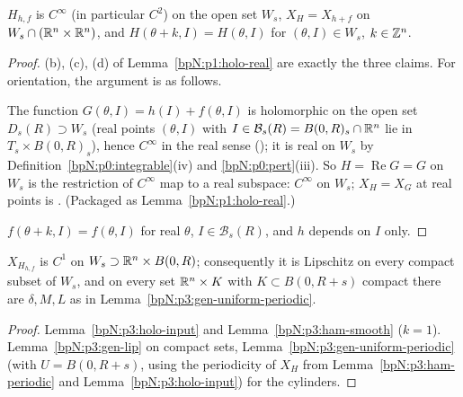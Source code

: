 \begin{lemma}\label{bpN:p3:holo-input}
$H_{h,f}$ is $C^\infty$ (in particular $C^2$) on the open set $W_s$, $X_{H}=X_{h+f}$ on $W_s\cap(\mathbb{R}^n\times\mathbb{R}^n)$, and
$H(\theta+k,I)=H(\theta,I)$ for $(\theta,I)\in W_s$, $k\in\mathbb{Z}^n$.
\end{lemma}
\begin{proof}
\label{stepN:p3:hi-cite} (b), (c), (d) of Lemma~\ref{bpN:p1:holo-real} are exactly the three claims. For orientation, the argument is as follows.

\label{stepN:p3:hi-reg} The function $G(\theta,I)=h(I)+f(\theta,I)$ is holomorphic on the open set $D_s(R)\supset W_s$ (real points $(\theta,I)$ with $I\in\mathcal B_s(R)=B(0,R)_s\cap\mathbb{R}^n$ lie in $T_s\times B(0,R)_s$), hence $C^\infty$ in the real sense (); it is real on $W_s$ by Definition~\ref{bpN:p0:integrable}(iv) and \ref{bpN:p0:pert}(iii). So $H=\operatorname{Re}G=G$ on $W_s$ is the restriction of $C^\infty$ map to a real subspace: $C^\infty$ on $W_s$; $X_H=X_G$ at real points is . (Packaged as Lemma~\ref{bpN:p1:holo-real}.)

\label{stepN:p3:hi-per} $f(\theta+k,I)=f(\theta,I)$ for real $\theta$, $I\in\mathcal B_s(R)$, and $h$ depends on $I$ only.
\end{proof}

\begin{theorem}\label{bpN:p3:lipschitz}
$X_{H_{h,f}}$ is $C^1$ on $W_s\supset\mathbb{R}^n\times B(0,R)$; consequently it is Lipschitz on every compact subset of $W_s$, and
on every set $\mathbb{R}^n\times K$ with $K\subset B(0,R+s)$ compact there are $\delta,M,L$ as in Lemma~\ref{bpN:p3:gen-uniform-periodic}.
\end{theorem}
\begin{proof}
\label{stepN:p3:lip-smooth} Lemma~\ref{bpN:p3:holo-input} and Lemma~\ref{bpN:p3:ham-smooth} ($k=1$).
\label{stepN:p3:lip-lip} Lemma~\ref{bpN:p3:gen-lip} on compact sets, Lemma~\ref{bpN:p3:gen-uniform-periodic} (with $U=B(0,R+s)$, using the periodicity of $X_H$ from Lemma~\ref{bpN:p3:ham-periodic} and Lemma~\ref{bpN:p3:holo-input}) for the cylinders.
\end{proof}

